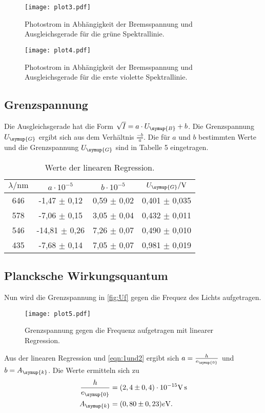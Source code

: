 \begin{figure}[H]
    \centering
    \label{fig:gruen}
    \caption{Photostrom in Abhängigkeit der Bremsspannung und Ausgleichsgerade für die grüne Spektrallinie.}
    \texttt{[image: plot3.pdf]}
\end{figure}

\begin{figure}[H]
    \centering
    \label{fig:violett1}
    \caption{Photostrom in Abhängigkeit der Bremsspannung und Ausgleichsgerade für die erste violette Spektrallinie.}
    \texttt{[image: plot4.pdf]}
\end{figure}

\subsection{Grenzspannung}
\label{sec:Grenzspannung}
Die Ausgleichsgerade hat die Form $\sqrt{I} = a \cdot U_{\symup{B}} + b$. Die Grenzspannung $U_{\symup{G}}$
ergibt sich aus dem Verhältnis $\frac{-b}{a}$. Die für $a$ und $b$ bestimmten Werte und die Grenzspannung
$U_{\symup{G}}$ sind in Tabelle 5 eingetragen.
\begin{table}[H]
    \centering
    \label{tab:UG}
    \caption{Werte der linearen Regression.}
    \begin{tabular}{c c c c}
        \toprule
        $\lambda/\unit{\nano\meter}$ & $a\cdot 10^{-5}$ & $b\cdot 10^{-5}$ & $U_{\symup{G}}/\unit{\volt}$\\
        \midrule
        646 &  -1,47 $\pm$ 0,12 & 0,59 $\pm$ 0,02 & 0,401 $\pm$ 0,035 \\
        578 &  -7,06 $\pm$ 0,15 & 3,05 $\pm$ 0,04 & 0,432 $\pm$ 0,011 \\
        546 & -14,81 $\pm$ 0,26 & 7,26 $\pm$ 0,07 & 0,490 $\pm$ 0,010 \\
        435 &  -7,68 $\pm$ 0,14 & 7,05 $\pm$ 0,07 & 0,981 $\pm$ 0,019 \\
        \bottomrule
    \end{tabular}
\end{table}

\subsection{Plancksche Wirkungsquantum}
\label{sec:Plancksche_Wirkungsquantum}
Nun wird die Grenzspannung in \autoref{fig:Uf} gegen die Frequez des Lichts aufgetragen.
\begin{figure}[H]
    \centering
    \caption{Grenzspannung gegen die Frequenz aufgetragen mit linearer Regression.}
    \label{fig:Uf}
    \texttt{[image: plot5.pdf]}
\end{figure}
Aus der linearen Regression und \autoref{eqn:1und2} ergibt sich $a=\frac{h}{e_{\symup{0}}}$ und
$b=A_{\symup{k}}$. Die Werte ermitteln sich zu
\begin{align*}
    \frac{h}{e_{\symup{0}}}&= (2,4 \pm 0,4)\cdot 10^{-15}\unit{\volt\second}\\
    A_{\symup{k}} &= (0,80 \pm 0,23) e\unit{\volt}.\\
\end{align*}

